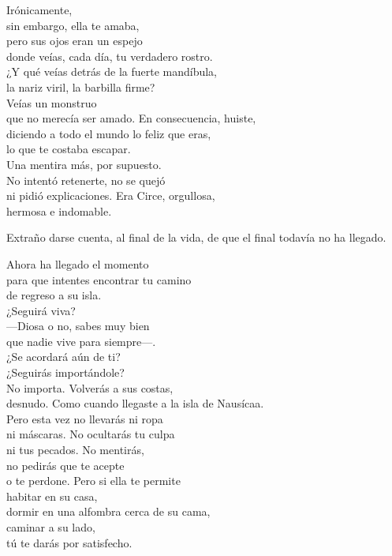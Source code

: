 \begin{versopropio}
Irónicamente,\\
sin embargo, ella te amaba,\\
pero sus ojos eran un espejo\\
donde veías, cada día, tu verdadero rostro.\\
¿Y qué veías detrás de la fuerte mandíbula,\\
la nariz viril, la barbilla firme?\\
Veías un monstruo\\
que no merecía ser amado.
\stanzabreak
En consecuencia, huiste,\\
diciendo a todo el mundo lo feliz que eras,\\
lo que te costaba escapar.\\
Una mentira más, por supuesto.\\
No intentó retenerte, no se quejó\\
ni pidió explicaciones. Era Circe, orgullosa,\\
hermosa e indomable.
\end{versopropio}

Extraño darse cuenta, al final de la vida, de que el final todavía no ha llegado.

\begin{versopropio}
Ahora ha llegado el momento\\
para que intentes encontrar tu camino\\
de regreso a su isla.\\
¿Seguirá viva?\\
---Diosa o no, sabes muy bien\\
que nadie vive para siempre---.\\
¿Se acordará aún de ti?\\
¿Seguirás importándole?\\
No importa. Volverás a sus costas,\\
desnudo. Como cuando llegaste a la isla de Nausícaa.\\
Pero esta vez no llevarás ni ropa\\
ni máscaras. No ocultarás tu culpa\\
ni tus pecados. No mentirás,\\
no pedirás que te acepte\\
o te perdone. Pero si ella te permite\\
habitar en su casa,\\
dormir en una alfombra cerca de su cama,\\
caminar a su lado,\\
tú te darás por satisfecho.
\end{versopropio}

